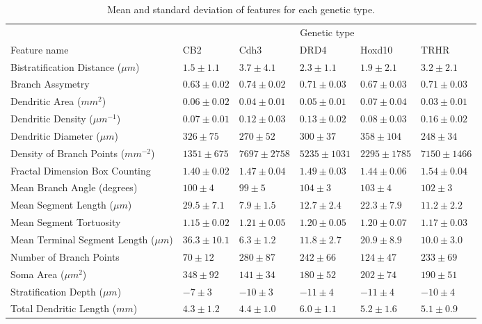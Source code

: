 \documentclass[11pt]{article}
\begin{document}
\clearpage

%
%

\begin{sidewaystable}
\begin{tabular}{llllll}
\toprule
 & \multicolumn{5}{c}{Genetic type}\\
Feature name & CB2 & Cdh3 & DRD4 & Hoxd10 & TRHR\\
\midrule
Bistratification Distance ($\mu m$)& $1.5 \pm 1.1$& $3.7 \pm 4.1$& $2.3 \pm 1.1$& $1.9 \pm 2.1$& $3.2 \pm 2.1$\\
Branch Assymetry& $0.63 \pm 0.02$& $0.74 \pm 0.02$& $0.71 \pm 0.03$& $0.67 \pm 0.03$& $0.71 \pm 0.03$\\
Dendritic Area ($mm^2$)& $0.06 \pm 0.02$& $0.04 \pm 0.01$& $0.05 \pm 0.01$& $0.07 \pm 0.04$& $0.03 \pm 0.01$\\
Dendritic Density ($\mu m^{-1}$)& $0.07 \pm 0.01$& $0.12 \pm 0.03$& $0.13 \pm 0.02$& $0.08 \pm 0.03$& $0.16 \pm 0.02$\\
Dendritic Diameter ($\mu m$)& $326 \pm 75$& $270 \pm 52$& $300 \pm 37$& $358 \pm 104$& $248 \pm 34$\\
Density of Branch Points ($mm^{-2}$)& $1351 \pm 675$& $7697 \pm 2758$& $5235 \pm 1031$& $2295 \pm 1785$& $7150 \pm 1466$\\
Fractal Dimension Box Counting& $1.40 \pm 0.02$& $1.47 \pm 0.04$& $1.49 \pm 0.03$& $1.44 \pm 0.06$& $1.54 \pm 0.04$\\
Mean Branch Angle (degrees)& $100 \pm 4$& $99 \pm 5$& $104 \pm 3$& $103 \pm 4$& $102 \pm 3$\\
Mean Segment Length ($\mu m$)& $29.5 \pm 7.1$& $7.9 \pm 1.5$& $12.7 \pm 2.4$& $22.3 \pm 7.9$& $11.2 \pm 2.2$\\
Mean Segment Tortuosity& $1.15 \pm 0.02$& $1.21 \pm 0.05$& $1.20 \pm 0.05$& $1.20 \pm 0.07$& $1.17 \pm 0.03$\\
Mean Terminal Segment Length ($\mu m$)& $36.3 \pm 10.1$& $6.3 \pm 1.2$& $11.8 \pm 2.7$& $20.9 \pm 8.9$& $10.0 \pm 3.0$\\
Number of Branch Points& $70 \pm 12$& $280 \pm 87$& $242 \pm 66$& $124 \pm 47$& $233 \pm 69$\\
Soma Area ($\mu m^2$)& $348 \pm 92$& $141 \pm 34$& $180 \pm 52$& $202 \pm 74$& $190 \pm 51$\\
Stratification Depth ($\mu m$)& $-7 \pm 3$& $-10 \pm 3$& $-11 \pm 4$& $-11 \pm 4$& $-10 \pm 4$\\
Total Dendritic Length ($mm$)& $4.3 \pm 1.2$& $4.4 \pm 1.0$& $6.0 \pm 1.1$& $5.2 \pm 1.6$& $5.1 \pm 0.9$\\
\bottomrule
\end{tabular}
\caption{Mean and standard deviation of features for each genetic type.}
\label{tab:featVals}
\end{sidewaystable}
\end{document}
